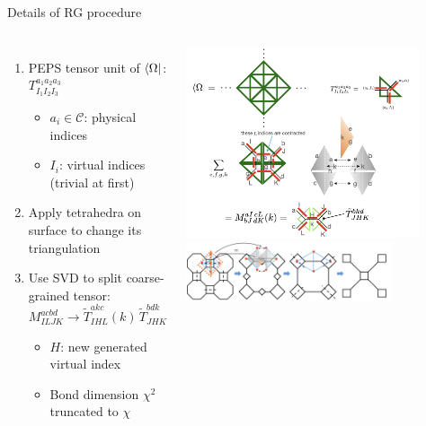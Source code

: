 \documentclass{fdubeamer}
\newcommand{\1}{\mathbb{1}}
\begin{document}
\begin{frame}{Details of RG procedure}

\begin{columns}[c]


    \begin{enumerate}
      \item PEPS tensor unit of $\bra{\Omega}$: $T^{a_1 a_2 a_3}_{I_1 I_2 I_3}$

        \begin{itemize}
          \item $a_i\in\mathcal{C}$: physical indices
          \item $I_i$: virtual indices (trivial at first)
        \end{itemize}

      \item Apply tetrahedra on surface to change its triangulation
      \item Use SVD to split coarse-grained tensor: $M^{acbd}_{ILJK}\to\tilde{T}^{akc}_{IHL}(k)\,\tilde{T}^{bdk}_{JHK}$

        \begin{itemize}
          \item $H$: new generated virtual index
          \item Bond dimension $\chi^2$ truncated to $\chi$
        \end{itemize}
    \end{enumerate}


    \centering
    \includegraphics[width=0.85\textwidth]{images/holographic/rg-2+1d-blocking.png} \\[1ex]
    \includegraphics[width=0.75\textwidth]{images/holographic/rg-2+1d.png}


\end{columns}
\end{frame}
\end{document}

